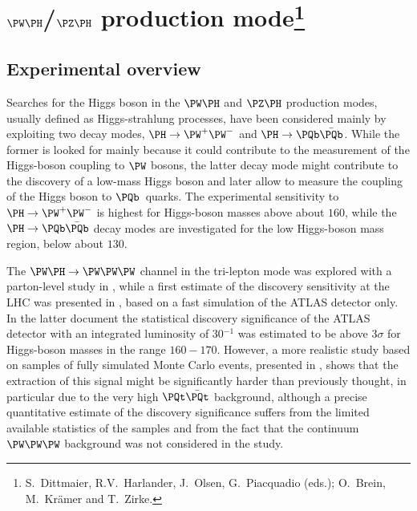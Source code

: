 
\section{$\PW\PH$/$\PZ\PH$ production mode\footnote{%
    S.~Dittmaier, R.V.~Harlander, J.~Olsen, G.~Piacquadio (eds.);
    O.~Brein, M.~Kr\"amer and T.~Zirke.}}

\subsection{Experimental overview}

Searches for the Higgs boson in the $\PW\PH$ and $\PZ\PH$ production modes,
usually defined as Higgs-strahlung processes, have been considered
mainly by exploiting two decay modes, $\PH \rightarrow \PW^{+}\PW^{-}$ and $\PH
\rightarrow \PQb\bar{\PQb}$. While the former is looked for mainly because it
could contribute to the measurement of the Higgs-boson coupling to $\PW$
bosons, the latter decay mode might contribute to the discovery of a 
low-mass Higgs boson and later allow to measure the coupling of the Higgs
boson to $\PQb$~quarks. The experimental sensitivity to $\PH \rightarrow \PW^{+}\PW^{-}$ 
is highest for Higgs-boson masses above about $160$\UGeV, while the 
$\PH \rightarrow \PQb\bar{\PQb}$ decay modes are investigated for 
the low Higgs-boson mass region, below about $130$\UGeV.

The $\PW\PH \rightarrow \PW\PW\PW$ channel in the tri-lepton mode was explored
with a parton-level study in , while a first
estimate of the discovery sensitivity at the LHC was presented in
, based on
a fast simulation of the ATLAS detector only. In the latter document the
statistical discovery significance of the ATLAS detector with an
integrated luminosity of $30$\Ufb$^{-1}$ was estimated to be above
$3\sigma$ for Higgs-boson masses in the range $160{-}170$\UGeV. However, a
more realistic study based on samples of fully simulated Monte Carlo
events, presented in , shows that the extraction of this
signal might be significantly harder than previously thought, in
particular due to the very high $\PQt\bar{\PQt}$ background, although a
precise quantitative estimate of the discovery significance suffers from
the limited available statistics of the samples and from the fact that
the continuum $\PW\PW\PW$ background was not considered in the study.

